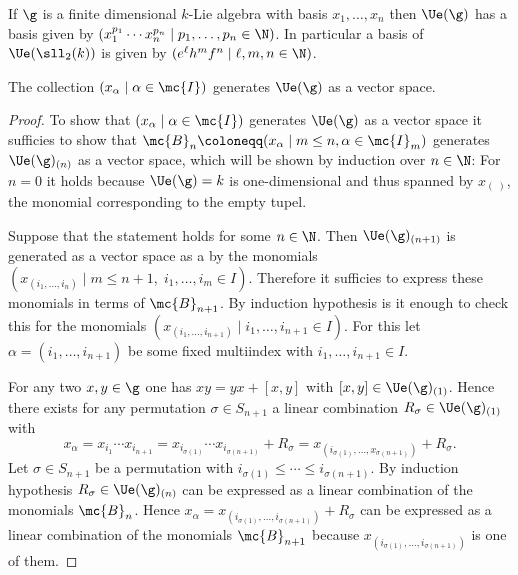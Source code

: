 \begin{example}
 If $\g$ is a finite dimensional $k$-Lie algebra with basis $x_1, \dotsc, x_n$ then $\Ue(\g)$ has a basis given by $(x_1^{p_1} \dotsm x_n^{p_n} \mid p_1, \dotsc, p_n \in \N)$. In particular a basis of $\Ue(\sll_2(k))$ is given by $(e^\ell h^m f^n \mid \ell, m ,n \in \N)$.
\end{example}


\begin{lemma}\label{lem: pbw concrete generating part}
 The collection $(x_\alpha \mid \alpha \in \mc{I})$ generates $\Ue(\g)$ as a vector space.
\end{lemma}
\begin{proof}
 To show that $(x_\alpha \mid \alpha \in \mc{I})$ generates $\Ue(\g)$ as a vector space it sufficies to show that $\mc{B}_n \coloneqq (x_\alpha \mid m \leq n, \alpha \in \mc{I}_m)$ generates $\Ue(\g)_{(n)}$ as a vector space, which will be shown by induction over $n \in \N$: For $n = 0$ it holds because $\Ue(\g) = k$ is one-dimensional and thus spanned by $x_{(\;)}$, the monomial corresponding to the empty tupel.
 
 Suppose that the statement holds for some $n \in \N$. Then $\Ue(\g)_{(n+1)}$ is generated as a vector space as a by the monomials $(x_{(i_1, \dotsc, i_n)} \mid m \leq n+1, \; i_1, \dotsc, i_m \in I)$. Therefore it sufficies to express these monomials in terms of $\mc{B}_{n+1}$. By induction hypothesis is it enough to check this for the monomials $(x_{(i_1, \dotsc, i_{n+1})} \mid i_1, \dotsc, i_{n+1} \in I)$. For this let $\alpha = (i_1, \dotsc, i_{n+1})$ be some fixed multiindex with $i_1, \dotsc, i_{n+1} \in I$.
 
 For any two $x,y \in \g$ one has $xy = yx + [x,y]$ with $[x,y] \in \Ue(\g)_{(1)}$. Hence there exists for any permutation $\sigma \in S_{n+1}$ a linear combination $R_\sigma \in \Ue(\g)_{(1)}$ with
 \[
  x_\alpha
  = x_{i_1} \dotsm x_{i_{n+1}}
  = x_{i_{\sigma(1)}} \dotsm x_{i_{\sigma(n+1)}} + R_\sigma
  = x_{(i_{\sigma(1)}, \dotsc, x_{\sigma(n+1)})} + R_\sigma.
 \]
 Let $\sigma \in S_{n+1}$ be a permutation with $i_{\sigma(1)} \leq \dotsb \leq i_{\sigma(n+1)}$. By induction hypothesis $R_\sigma \in \Ue(\g)_{(n)}$ can be expressed as a linear combination of the monomials $\mc{B}_n$. Hence $x_\alpha = x_{(i_{\sigma(1)}, \dotsc, i_{\sigma(n+1)})} + R_\sigma$ can be expressed as a linear combination of the monomials $\mc{B}_{n+1}$ because $x_{(i_{\sigma(1)}, \dotsc, i_{\sigma(n+1)})}$ is one of them.
\end{proof}


